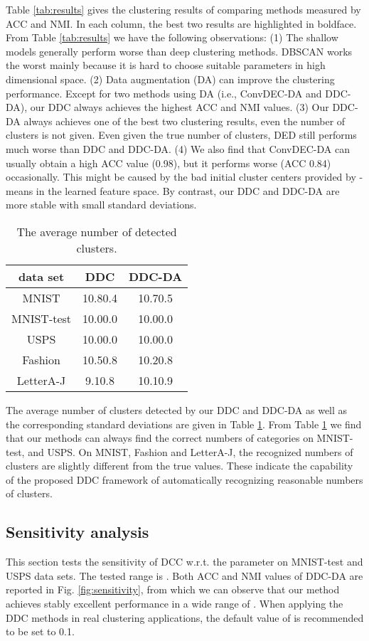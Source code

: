 \documentclass[10pt,twocolumn,letterpaper]{article}
\begin{document}
Table \ref{tab:results} gives the clustering results of comparing methods measured by ACC and NMI. In each column, the best two results are highlighted in boldface. 
From Table \ref{tab:results} we have the following observations: (1) The shallow models generally perform worse than deep clustering methods. DBSCAN works the worst mainly because it is hard to choose suitable parameters in high dimensional space.
(2) Data augmentation (DA) can improve the clustering performance. Except for two methods using DA (i.e., ConvDEC-DA and DDC-DA), our DDC always achieves the highest ACC and NMI values.
(3) Our DDC-DA always achieves one of the best two clustering results, even the number of clusters is not given.
Even given the true number of clusters, DED still performs much worse than DDC and DDC-DA.
(4) We also find that ConvDEC-DA can usually obtain a high ACC value (0.98), but it performs worse (ACC 0.84) occasionally. This might be caused by the bad initial cluster centers provided by -means in the learned feature space. By contrast, our DDC and DDC-DA are more stable with small standard deviations. 



\begin{table}[!t]
  \centering
  \caption{The average number of detected clusters.}
    \begin{tabular}{ccc}
    \hline
      data set    & DDC   & DDC-DA \\
    \hline
    MNIST & 10.80.4 & 10.70.5 \\
    MNIST-test & 10.00.0 & 10.00.0 \\
    USPS  & 10.00.0 & 10.00.0 \\
    Fashion & 10.50.8 & 10.20.8 \\
    LetterA-J & 9.10.8 & 10.10.9 \\
    \hline
    \end{tabular}\label{tab:numberK}\end{table}The average number of clusters detected by our DDC and DDC-DA as well as the corresponding standard deviations are given in Table \ref{tab:numberK}. From Table \ref{tab:numberK} we find that our methods can always find the correct numbers of categories on MNIST-test, and USPS. On MNIST, Fashion and LetterA-J, the recognized numbers of clusters are slightly different from the true values. These indicate the capability of the proposed DDC framework of automatically recognizing reasonable numbers of clusters.


\subsection{Sensitivity analysis}\label{sec:sensitivity}
This section tests the sensitivity of DCC w.r.t. the parameter  on MNIST-test and USPS data sets. 
The tested range is . Both ACC and NMI values of DDC-DA are reported in Fig. \ref{fig:sensitivity}, from which we can observe that our method achieves stably excellent performance in a wide range of . When applying the DDC methods in real clustering applications, the default value of  is recommended to be set to 0.1.
\end{document}
